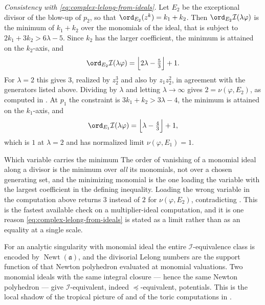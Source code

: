 \begin{example}
\emph{Consistency with \eqref{eq:complex-lelong-from-ideals}.}  Let
\(E_2\) be the exceptional divisor of the blow-up of \(p_2\), so that
\(\ord_{E_2}(z^k)=k_1+k_2\).  Then
\(\ord_{E_2}\mathcal I(\lambda\varphi)\) is the minimum of \(k_1+k_2\)
over the monomials of the ideal, that is subject to
\(2k_1+3k_2>6\lambda-5\).  Since \(k_2\) has the larger coefficient, the
minimum is attained on the \(k_2\)-axis, and
\[
 \ord_{E_2}\mathcal I(\lambda\varphi)
 =\Bigl\lfloor2\lambda-\tfrac53\Bigr\rfloor+1 .
\]
For \(\lambda=2\) this gives \(3\), realized by \(z_2^3\) and also by
\(z_1z_2^2\), in agreement with the generators listed above.  Dividing by
\(\lambda\) and letting \(\lambda\to\infty\) gives \(2=\nu(\varphi,E_2)\),
as computed in .  At \(p_1\) the constraint is
\(3k_1+k_2>3\lambda-4\), the minimum is attained on the \(k_1\)-axis, and
\[
 \ord_{E_1}\mathcal I(\lambda\varphi)
 =\Bigl\lfloor\lambda-\tfrac43\Bigr\rfloor+1 ,
\]
which is \(1\) at \(\lambda=2\) and has normalized limit
\(\nu(\varphi,E_1)=1\).
\end{example}

\begin{warning}{Which variable carries the minimum}
\label{warn:ch51-ord-monomial}
The order of vanishing of a monomial ideal along a divisor is the minimum
over \emph{all} its monomials, not over a chosen generating set, and the
minimizing monomial is the one loading the variable with the largest
coefficient in the defining inequality.  Loading the wrong variable in the
computation above returns \(3\) instead of \(2\) for
\(\nu(\varphi,E_2)\), contradicting .  This is the
fastest available check on a multiplier-ideal computation, and it is one
reason \eqref{eq:complex-lelong-from-ideals} is stated as a limit rather
than as an equality at a single scale.
\end{warning}

\begin{remark}
\label{rem:ch51-newton}
For an analytic singularity with monomial ideal the entire
\(\mathcal I\)-equivalence class is encoded by
\(\operatorname{Newt}(\mathfrak a)\), and the divisorial Lelong numbers
are the support function of that Newton polyhedron evaluated at monomial
valuations.  Two monomial ideals with the same integral closure --- hence
the same Newton polyhedron --- give \(\mathcal I\)-equivalent, indeed
\(\preceq\)-equivalent, potentials.  This is the local shadow of the
tropical picture of  and of the toric
computations in .
\end{remark}

